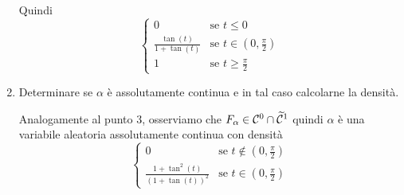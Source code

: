 \begin{enumerate}
Quindi
\[
\begin{cases}
0 &\text{se }t\leq 0 \\
\displaystyle\frac{\tan(t)}{1+\tan(t)} &\text{se }\displaystyle t\in\left(0,\frac{\pi}{2}\right) \\
1 &\text{se }\displaystyle t\geq \frac{\pi}{2}
\end{cases}
\]

\item Determinare se $\alpha$ è assolutamente continua e in tal caso calcolarne la densità.

Analogamente al punto 3, osserviamo che $F_\alpha\in\mathcal{C}^0\cap\widetilde{\mathcal{C}}^1$ quindi $\alpha$ è una variabile aleatoria assolutamente continua con densità
\[
\begin{cases}
0 &\text{se }\displaystyle t\not\in\left(0,\frac{\pi}{2}\right) \\
\displaystyle\frac{1+\tan^2(t)}{(1+\tan(t))^2} &\text{se }\displaystyle t\in\left(0,\frac{\pi}{2}\right)
\end{cases}
\]
\end{enumerate}
